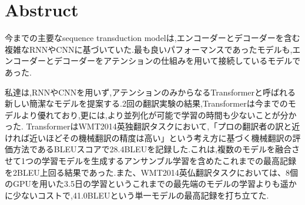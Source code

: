 \documentclass[twocolumn]{jarticle}     %
\begin{document}

\section*{Abstruct}
今までの主要なsequence transduction modelは,エンコーダーとデコーダーを含む
複雑なRNNやCNNに基づいていた.最も良いパフォーマンスであったモデルも,エンコーダーとデコーダーをアテンションの仕組みを用いて接続しているモデルであった.\par
私達は,RNNやCNNを用いず,アテンションのみからなるTransformerと呼ばれる新しい簡潔なモデルを提案する.2回の翻訳実験の結果,Transformerは今までのモデルより優れており,更には,より並列化が可能で学習の時間も少ないことが分かった.
TransformerはWMT2014英独翻訳タスクにおいて,「プロの翻訳者の訳と近ければ近いほどその機械翻訳の精度は高い」という考え方に基づく機械翻訳の評価方法であるBLEUスコアで28.4BLEUを記録した.これは,複数のモデルを融合させて1つの学習モデルを生成するアンサンブル学習を含めたこれまでの最高記録を2BLEU上回る結果であった.また、WMT2014英仏翻訳タスクにおいては、8個のGPUを用いた3.5日の学習というこれまでの最先端のモデルの学習よりも遥かに少ないコストで,41.0BLEUという単一モデルの最高記録を打ち立てた.

\end{document}
